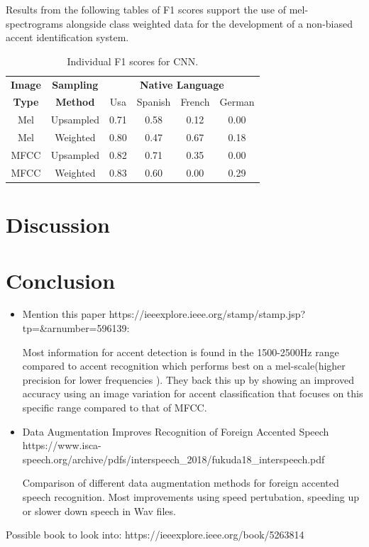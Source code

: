 \documentclass[11pt,a4paper,twoside]{article}
\begin{document}
Results from the following tables of F1 scores support the use of mel-spectrograms alongside class weighted data for the development of a non-biased accent identification system.

\begin{table}[H]
\begin{center}
\begin{tabular}{|c|c|c|c|c|c|}
\hline
\textbf{Image} & \textbf{Sampling}&\multicolumn{4}{|c|}{\textbf{Native Language}}\\
\cline{3-6}
\textbf{Type} & \textbf{Method}& Usa & Spanish & French & German\\
\hline
Mel & Upsampled & 0.71 & 0.58 & 0.12 & 0.00\\
\hline
Mel & Weighted & 0.80 & 0.47 & 0.67 & 0.18\\
\hline
MFCC & Upsampled & 0.82 & 0.71 & 0.35 & 0.00\\
\hline
MFCC & Weighted & 0.83 & 0.60 & 0.00 & 0.29\\
\hline
\end{tabular}
\label{tabl:}
\caption{Individual F1 scores for CNN.}
\end{center}
\end{table}





\section{Discussion}


\section{Conclusion}

\begin{itemize}
    \item Mention this paper https://ieeexplore.ieee.org/stamp/stamp.jsp?tp=&arnumber=596139:
    
    Most information for accent detection is found in the 1500-2500Hz range compared to accent recognition which performs best on a mel-scale(higher precision for lower frequencies ). They back this up by showing an improved accuracy using an image variation for accent classification that focuses on this specific range compared to that of MFCC.
    
    \item Data Augmentation Improves Recognition of Foreign Accented Speech
    https://www.isca-speech.org/archive/pdfs/interspeech_2018/fukuda18_interspeech.pdf
    
    Comparison of different data augmentation methods for foreign accented speech recognition. Most improvements using speed pertubation, speeding up or slower down speech in Wav files.
\end{itemize}


\printbibliography

Possible book to look into:
https://ieeexplore.ieee.org/book/5263814

\newpage
\end{document}

